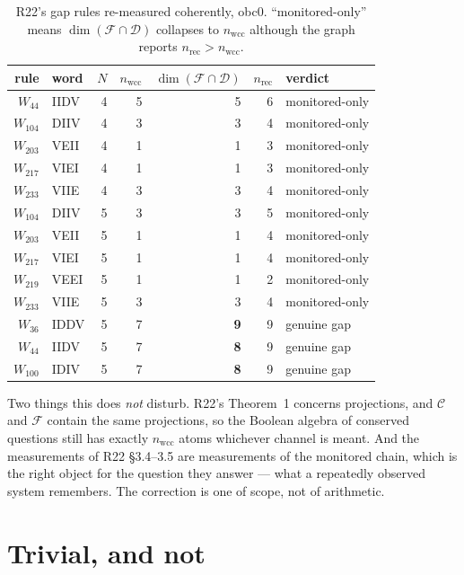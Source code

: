\documentclass[11pt]{article}
\newcommand{\C}{\mathcal{C}}
\newcommand{\F}{\mathcal{F}}
\newcommand{\D}{\mathcal{D}}
\theoremstyle{plain}
\theoremstyle{remark}
\begin{document}
\begin{table}[htbp]
\centering
\caption{R22's gap rules re-measured coherently, obc0. ``monitored-only'' means
$\dim(\F\cap\D)$ collapses to $n_{\mathrm{wcc}}$ although the graph reports
$n_{\mathrm{rec}} > n_{\mathrm{wcc}}$.}
\label{tab:audit}
\begin{tabular}{rlrrrrl}
\toprule
rule & word & $N$ & $n_{\mathrm{wcc}}$ & $\dim(\F\cap\D)$ & $n_{\mathrm{rec}}$
& verdict \\
\midrule
$W_{44}$  & IIDV & 4 & 5 & 5 & 6 & monitored-only \\
$W_{104}$ & DIIV & 4 & 3 & 3 & 4 & monitored-only \\
$W_{203}$ & VEII & 4 & 1 & 1 & 3 & monitored-only \\
$W_{217}$ & VIEI & 4 & 1 & 1 & 3 & monitored-only \\
$W_{233}$ & VIIE & 4 & 3 & 3 & 4 & monitored-only \\
\midrule
$W_{104}$ & DIIV & 5 & 3 & 3 & 5 & monitored-only \\
$W_{203}$ & VEII & 5 & 1 & 1 & 4 & monitored-only \\
$W_{217}$ & VIEI & 5 & 1 & 1 & 4 & monitored-only \\
$W_{219}$ & VEEI & 5 & 1 & 1 & 2 & monitored-only \\
$W_{233}$ & VIIE & 5 & 3 & 3 & 4 & monitored-only \\
\midrule
$W_{36}$  & IDDV & 5 & 7 & \textbf{9} & 9 & genuine gap \\
$W_{44}$  & IIDV & 5 & 7 & \textbf{8} & 9 & genuine gap \\
$W_{100}$ & IDIV & 5 & 7 & \textbf{8} & 9 & genuine gap \\
\bottomrule
\end{tabular}
\end{table}

Two things this does \emph{not} disturb. R22's Theorem~1 concerns projections,
and $\C$ and $\F$ contain the same projections, so the Boolean algebra of
conserved questions still has exactly $n_{\mathrm{wcc}}$ atoms whichever channel
is meant. And the measurements of R22 \S3.4--3.5 are measurements of the
monitored chain, which is the right object for the question they answer --- what
a repeatedly observed system remembers. The correction is one of scope, not of
arithmetic.

\section{Trivial, and not}
\end{document}
